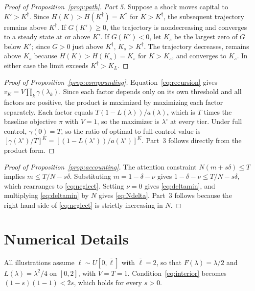 \documentclass[11pt,a4paper]{article}
\theoremstyle{plain}
\newcommand{\lbar}{\bar{\ell}}
\begin{document}
\begin{proof}[Proof of Proposition~\ref{prop:path}]
\emph{Part 5.} Suppose a shock moves capital to $K' > K^\dagger$. Since $H(K) > H(K^\dagger) = K^\dagger$ for $K > K^\dagger$, the subsequent trajectory remains above $K^\dagger$. If $G(K') \ge 0$, the trajectory is nondecreasing and converges to a steady state at or above $K'$. If $G(K') < 0$, let $K_s$ be the largest zero of $G$ below $K'$; since $G > 0$ just above $K^\dagger$, $K_s > K^\dagger$. The trajectory decreases, remains above $K_s$ because $H(K) > H(K_s) = K_s$ for $K > K_s$, and converges to $K_s$. In either case the limit exceeds $K^\dagger > K_L$.
\end{proof}

\begin{proof}[Proof of Proposition~\ref{prop:compounding}]
Equation~\eqref{eq:recursion} gives $v_K = V\prod_k \gamma(\lambda_k)$. Since each factor depends only on its own threshold and all factors are positive, the product is maximized by maximizing each factor separately. Each factor equals $T(1 - L(\lambda))/a(\lambda)$, which is $T$ times the baseline objective $\pi$ with $V = 1$, so the maximizer is $\lambda^\circ$ at every tier. Under full control, $\gamma(0) = T$, so the ratio of optimal to full-control value is $[\gamma(\lambda^\circ)/T]^K = [(1 - L(\lambda^\circ))/a(\lambda^\circ)]^K$. Part~3 follows directly from the product form.
\end{proof}

\begin{proof}[Proof of Proposition~\ref{prop:accounting}]
The attention constraint $N(m + s\delta) \le T$ implies $m \le T/N - s\delta$. Substituting $m = 1 - \delta - \nu$ gives $1 - \delta - \nu \le T/N - s\delta$, which rearranges to \eqref{eq:neglect}. Setting $\nu = 0$ gives \eqref{eq:deltamin}, and multiplying \eqref{eq:deltamin} by $N$ gives \eqref{eq:Ndelta}. Part~3 follows because the right-hand side of \eqref{eq:neglect} is strictly increasing in $N$.
\end{proof}

\section{Numerical Details}

All illustrations assume $\ell \sim U[0, \lbar]$ with $\lbar = 2$, so that $F(\lambda) = \lambda/2$ and $L(\lambda) = \lambda^2/4$ on $[0, 2]$, with $V = T = 1$. Condition~\eqref{eq:interior} becomes $(1 - s)(1 - 1) < 2s$, which holds for every $s > 0$.
\end{document}
